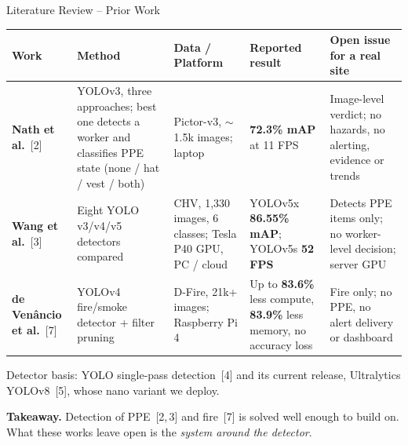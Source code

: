 \documentclass[aspectratio=169,10pt]{beamer}
\begin{document}
\begin{frame}{Literature Review -- Prior Work}
  \scriptsize
  \renewcommand{\arraystretch}{1.25}
  \begin{tabularx}{\linewidth}{@{}L{2.0cm} L{3.0cm} L{2.4cm} L{2.4cm} Y@{}}
    \toprule
    \textbf{Work} & \textbf{Method} & \textbf{Data / Platform} & \textbf{Reported result} & \textbf{Open issue for a real site}\\
    \midrule
    \textbf{Nath et al.}~[2] 
      & YOLOv3, three approaches; best one detects a worker and classifies PPE state (none / hat / vest / both)
      & Pictor-v3, $\sim$1.5k images; laptop
      & \textbf{72.3\% mAP} at 11 FPS
      & Image-level verdict; no hazards, no alerting, evidence or trends\\
    \textbf{Wang et al.}~[3] 
      & Eight YOLO v3/v4/v5 detectors compared
      & CHV, 1,330 images, 6 classes; Tesla P40 GPU, PC / cloud
      & YOLOv5x \textbf{86.55\% mAP}; YOLOv5s \textbf{52 FPS}
      & Detects PPE items only; no worker-level decision; server GPU\\
    \textbf{de Ven\^ancio et al.}~[7] 
      & YOLOv4 fire/smoke detector + filter pruning
      & D-Fire, 21k+ images; Raspberry Pi 4
      & Up to \textbf{83.6\%} less compute, \textbf{83.9\%} less memory, no accuracy loss
      & Fire only; no PPE, no alert delivery or dashboard\\
    \bottomrule
  \end{tabularx}\par\vspace{0.2em}
  {\tiny\color{slate} Detector basis: YOLO single-pass detection~[4] and its current release,
  Ultralytics YOLOv8~[5], whose nano variant we deploy.\par}

  \vspace{0.6em}
  {\small\textbf{Takeaway.} Detection of PPE~[2,\,3] and fire~[7] is solved well enough to build on.
  What these works leave open is the \emph{system around the detector}.\par}
\end{frame}
\end{document}
